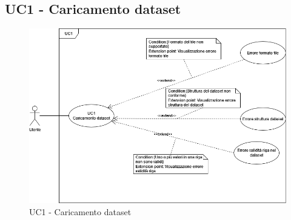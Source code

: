 \subsection{UC1 - Caricamento dataset}
\begin{figure}[h!]
    \centering
    \includegraphics[scale=0.50]{../../assets/Caricamento_dataset.png}
    \caption{UC1 - Caricamento dataset}
\end{figure}
